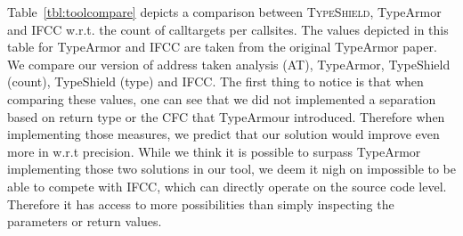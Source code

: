 Table~\ref{tbl:toolcompare} depicts a comparison between \textsc{TypeShield}, TypeArmor and IFCC w.r.t. the count of calltargets per callsites.
The values depicted in this table for TypeArmor and IFCC are taken from the original TypeArmor paper.
We compare our version of address taken analysis (AT), TypeArmor, TypeShield (count), TypeShield (type) and IFCC. 
The first thing to notice is that when comparing these values, one can see that we did not implemented a separation based on return type or the 
CFC that TypeArmour introduced. Therefore when implementing those measures, we predict that our solution would improve even more in w.r.t precision.
While we think it is possible to surpass TypeArmor implementing those two solutions in our tool, we deem it nigh on impossible to be able to compete with IFCC,
which can directly operate on the source code level. Therefore it has access to more possibilities than simply inspecting the parameters or return values.
